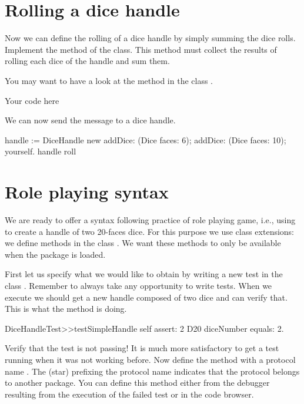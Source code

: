 \documentclass[a4paper,10pt,twoside]{book}
\begin{document}
\section{ Rolling a dice handle}
Now we can define the rolling of a dice handle by simply summing the dice rolls. Implement the  method of the  class. This method must collect the results of rolling each dice of the handle and sum them.

\begin{note}

You may want to have a look at the method  in the class .
\end{note}


\begin{code}{}
Your code here
\end{code}


We can now send the message  to a dice handle.


\begin{code}{}
handle := DiceHandle new
    addDice: (Dice faces: 6);
    addDice: (Dice faces: 10);
    yourself.
handle roll
\end{code}

\section{ Role playing syntax}
We are ready to offer a syntax following practice of role playing game, i.e., using  to create a handle of two 20-faces dice.  For this purpose we use class extensions: we define methods in the class . We want these methods to only be available when the package  is loaded.

First let us specify what we would like to obtain by writing a new test in the class . Remember to always take  any opportunity to write tests.  When we execute  we  should get a new handle composed of two dice and can verify that. This is what the method  is doing.


\begin{code}{}
DiceHandleTest>>testSimpleHandle
    self assert: 2 D20 diceNumber equals: 2.
\end{code}


Verify that the test is not passing! It is much more satisfactory to get a test running when it was not working before. Now define the method  with a protocol name . The \ct{*} (star) prefixing the protocol name indicates that the protocol belongs to another package. You can define this method either from the debugger resulting from the execution of the failed test or in the code browser.
\end{document}
